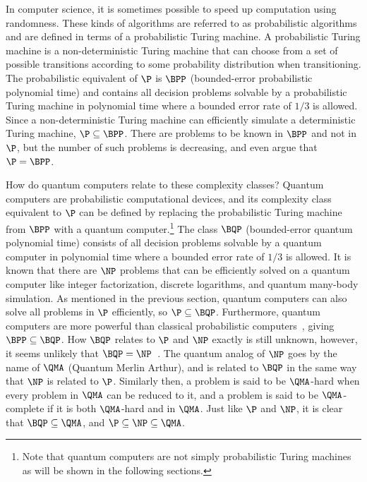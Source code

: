 In computer science, it is sometimes possible to speed up computation using randomness.
These kinds of algorithms are referred to as probabilistic algorithms and are defined in terms of a probabilistic Turing machine.
A probabilistic Turing machine is a non-deterministic Turing machine that can choose from a set of possible transitions according to some probability distribution when transitioning.
The probabilistic equivalent of $\P$ is $\BPP$ (bounded-error probabilistic polynomial time) and contains all decision problems solvable by a probabilistic Turing machine in polynomial time where a bounded error rate of $1/3$ is allowed.
Since a non-deterministic Turing machine can efficiently simulate a deterministic Turing machine, $\P \subseteq \BPP$.
There are problems to be known in $\BPP$ and not in $\P$, but the number of such problems is decreasing, and \textcite{goldreich2011world, nisan1994hardness} even argue that $\P = \BPP$.

How do quantum computers relate to these complexity classes?
Quantum computers are probabilistic computational devices, and its complexity class equivalent to $\P$ can be defined by replacing the probabilistic Turing machine from $\BPP$ with a quantum computer.\footnote{Note that quantum computers are not simply probabilistic Turing machines as will be shown in the following sections.}
The class $\BQP$ (bounded-error quantum polynomial time) consists of all decision problems solvable by a quantum computer in polynomial time where a bounded error rate of $1/3$ is allowed.
It is known that there are $\NP$ problems that can be efficiently solved on a quantum computer like integer factorization, discrete logarithms, and quantum many-body simulation.
As mentioned in the previous section, quantum computers can also solve all problems in $\P$ efficiently, so $\P \subseteq \BQP$.
Furthermore, quantum computers are more powerful than classical probabilistic computers~\cite{bernstein1997quantum}, giving $\BPP \subseteq \BQP$.
How $\BQP$ relates to $\P$ and $\NP$ exactly is still unknown, however, it seems unlikely that $\BQP = \NP$~\cite{aaronson2010bqp}.
The quantum analog of $\NP$ goes by the name of $\QMA$ (Quantum Merlin Arthur), and is related to $\BQP$ in the same way that $\NP$ is related to $\P$.
Similarly then, a problem is said to be $\QMA$-hard when every problem in $\QMA$ can be reduced to it, and a problem is said to be $\QMA$-complete if it is both $\QMA$-hard and in $\QMA$.
Just like $\P$ and $\NP$, it is clear that $\BQP \subseteq \QMA$, and $\P \subseteq \NP \subseteq \QMA$.

